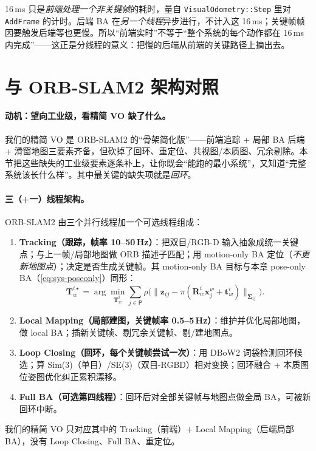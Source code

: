 \begin{pitfall}
16\,ms 只是\emph{前端处理一个非关键帧}的耗时，量自 \texttt{VisualOdometry::Step} 里对 \texttt{AddFrame} 的计时。后端 BA 在\emph{另一个线程}异步进行，不计入这 16\,ms；关键帧帧因要触发后端等也更慢。所以“前端实时”不等于“整个系统的每个动作都在 16\,ms 内完成”——这正是分线程的意义：把慢的后端从前端的关键路径上摘出去。
\end{pitfall}

\section{与 ORB-SLAM2 架构对照}
\label{sec:sys-orbslam}
\label{sec:sys-loop}

\paragraph{动机：望向工业级，看精简 VO 缺了什么。}
我们的精简 VO 是 ORB-SLAM2 的“骨架简化版”——前端追踪 + 局部 BA 后端 + 滑窗地图三要素齐备，但砍掉了回环、重定位、共视图/本质图、冗余剔除。本节把这些缺失的工业级要素逐条补上，让你既会“能跑的最小系统”，又知道“完整系统该长什么样”。其中最关键的缺失项就是\emph{回环}。

\paragraph{三（+一）线程架构。}
ORB-SLAM2\cite{murartal2017orbslam2} 由三个并行线程加一个可选线程组成：
\begin{enumerate}
  \item \textbf{Tracking（跟踪，帧率 10--50\,Hz）}：把双目/RGB-D 输入抽象成统一关键点；与上一帧/局部地图做 ORB 描述子匹配；用 motion-only BA 定位（\emph{不更新地图点}）；决定是否生成关键帧。其 motion-only BA 目标与本章 pose-only BA（\cref{eq:sys-poseonly}）同形：
  \begin{equation}
  \mathbf{T}_w^{i\star}=\arg\min_{\mathbf{T}_w^i}\sum_{j\in\mathsf{P}}\rho\Big(\big\|\mathbf{z}_{ij}-\pi(\mathbf{R}_w^i\mathbf{x}_j^w+\mathbf{t}_w^i)\big\|_{\boldsymbol\Sigma_{ij}}\Big).
  \label{eq:sys-orb-motiononly}
  \end{equation}
  \item \textbf{Local Mapping（局部建图，关键帧率 0.5--5\,Hz）}：维护并优化局部地图，做 local BA；插新关键帧、剔冗余关键帧、剔/建地图点。
  \item \textbf{Loop Closing（回环，每个关键帧尝试一次）}：用 DBoW2 词袋检测回环候选；算 Sim(3)（单目）/SE(3)（双目-RGBD）相对变换；回环融合 + 本质图位姿图优化纠正累积漂移。
  \item \textbf{Full BA（可选第四线程）}：回环后对全部关键帧与地图点做全局 BA，可被新回环中断。
\end{enumerate}
我们的精简 VO 只对应其中的 Tracking（前端）+ Local Mapping（后端局部 BA），没有 Loop Closing、Full BA、重定位。

